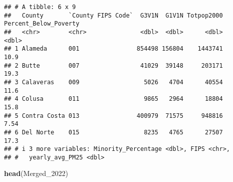 \documentclass[
]{article}
\newenvironment{Shaded}{\begin{snugshade}}{\end{snugshade}}
\newcommand{\AttributeTok}[1]{\textcolor[rgb]{0.13,0.29,0.53}{#1}}
\newcommand{\CommentTok}[1]{\textcolor[rgb]{0.56,0.35,0.01}{\textit{#1}}}
\newcommand{\FunctionTok}[1]{\textcolor[rgb]{0.13,0.29,0.53}{\textbf{#1}}}
\newcommand{\NormalTok}[1]{#1}
\newcommand{\OtherTok}[1]{\textcolor[rgb]{0.56,0.35,0.01}{#1}}
\newcommand{\SpecialCharTok}[1]{\textcolor[rgb]{0.81,0.36,0.00}{\textbf{#1}}}
\newcommand{\StringTok}[1]{\textcolor[rgb]{0.31,0.60,0.02}{#1}}
\begin{document}
\begin{Shaded}
\end{Shaded}

\begin{verbatim}
## # A tibble: 6 x 9
##   County       `County FIPS Code`  G3V1N  G1V1N Totpop2000 Percent_Below_Poverty
##   <chr>        <chr>               <dbl>  <dbl>      <dbl>                 <dbl>
## 1 Alameda      001                854498 156804    1443741                 10.9 
## 2 Butte        007                 41029  39148     203171                 19.3 
## 3 Calaveras    009                  5026   4704      40554                 11.6 
## 4 Colusa       011                  9865   2964      18804                 15.8 
## 5 Contra Costa 013                400979  71575     948816                  7.54
## 6 Del Norte    015                  8235   4765      27507                 17.3 
## # i 3 more variables: Minority_Percentage <dbl>, FIPS <chr>,
## #   yearly_avg_PM25 <dbl>
\end{verbatim}

\begin{Shaded}
\begin{Highlighting}[]
\FunctionTok{head}\NormalTok{(Merged\_2022)}
\end{Highlighting}
\end{Shaded}
\end{document}

